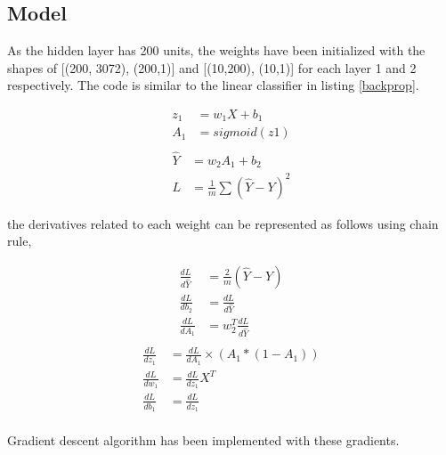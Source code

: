 \documentclass[a4paper, 12pt]{article}
\begin{document}
		\subsection{Model}
			As the hidden layer has 200 units, the weights have been initialized with the shapes of [(200, 3072), (200,1)] and [(10,200), (10,1)] for each layer 1 and 2 respectively. The code is similar to the linear classifier in listing \ref{backprop}.
			\begin{multicols}{2}
				\noindent
				\begin{align*}
					z_1 & = w_1X + b_1\\
					A_1 &= sigmoid(z1) \\
				\end{align*}
				\begin{align*}
					\hat{Y} & = w_2A_1 + b_2 \\
					L &= \frac{1}{m}\sum{(\hat{Y}-Y)^2}  
				\end{align*}
			\end{multicols}
		the derivatives related to each weight can be represented as follows using chain rule,
		\begin{multicols}{2}
			\noindent
			\begin{align*}
				\frac{dL}{d\hat{Y}} &= \frac{2}{m}(\hat{Y} - Y) \\
				\frac{dL}{db_2} &= \frac{dL}{d\hat{Y}}\\
				\frac{dL}{dA_1} &= w_2^T\frac{dL}{d\hat{Y}}\\
			\end{align*}
			\begin{align*}
				\frac{dL}{dz_1} &= \frac{dL}{dA_1} \times (A_1 * (1-A_1))\\
				\frac{dL}{dw_1} &= \frac{dL}{dz_1}X^T\\
				\frac{dL}{db_1} &= \frac{dL}{dz_1}\\
			\end{align*}
		\end{multicols}
		Gradient descent algorithm has been implemented with these gradients.
\end{document}
